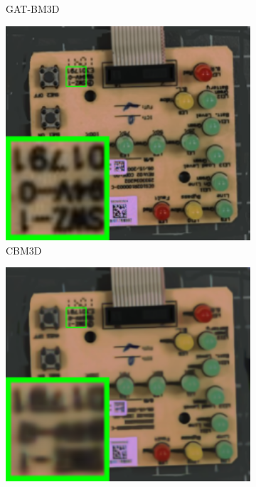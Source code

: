 \begin{figure}
\begin{subfigure}[t]{0.19\textwidth}
		\caption{GAT-BM3D}
    \end{subfigure}
    \hfill
    \begin{subfigure}[t]{0.19\textwidth}
        \centering
        \includegraphics[width=1\textwidth]{images/guided/nc/resize_br_CBM3D_circuit.png}
\caption{CBM3D}
    \end{subfigure}
    \hfill
    \begin{subfigure}[t]{0.19\textwidth}
        \centering
        \includegraphics[width=1\textwidth]{images/guided/nc/resize_br_WNNM_circuit.png}

\end{subfigure}
\end{figure}

